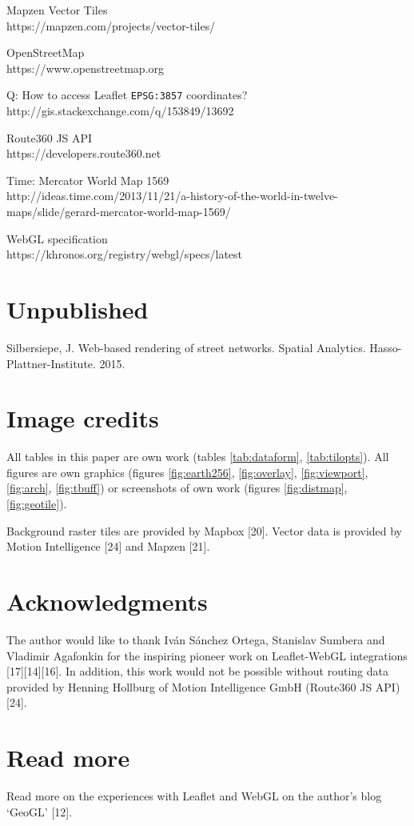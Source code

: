 \documentclass{motivation}
\begin{document}
\begin{enumerate}[{[1]}]
  \item Mapzen Vector Tiles\\
    https://mapzen.com/projects/vector-tiles/
  \item OpenStreetMap\\
    https://www.openstreetmap.org
  \item Q: How to access Leaflet \texttt{EPSG:3857} coordinates?\\
    http://gis.stackexchange.com/q/153849/13692
  \item Route360 JS API\\
    https://developers.route360.net
  \item Time: Mercator World Map 1569\\
    http://ideas.time.com/2013/11/21/a-history-of-the-world-in-twelve-maps/slide/gerard-mercator-world-map-1569/
  \item WebGL specification\\
    https://khronos.org/registry/webgl/specs/latest
  \end{enumerate}

\section{Unpublished}
  \begin{enumerate}[{[1]}]
  \setcounter{enumi}{26}
  \item Silbersiepe, J. Web-based rendering of street networks. Spatial Analytics. Hasso-Plattner-Institute. 2015.
  \end{enumerate}

\section{Image credits}
  All tables in this paper are own work (tables \ref{tab:dataform}, \ref{tab:tilopts}). All figures are own graphics (figures \ref{fig:earth256}, \ref{fig:overlay}, \ref{fig:viewport}, \ref{fig:arch}, \ref{fig:tbuff}) or screenshots of own work (figures \ref{fig:distmap}, \ref{fig:geotile}).\par

  Background raster tiles are provided by Mapbox [20]. Vector data is provided by Motion Intelligence [24] and Mapzen [21].

\section{Acknowledgments}
  The author would like to thank Iván Sánchez Ortega, Stanis\-lav Sumbera and Vladimir Agafonkin for the inspiring pioneer work on Leaflet-WebGL integrations [17][14][16]. In addition, this work would not be possible without routing data provided by Henning Hollburg of Motion Intelligence GmbH (Route360 JS API) [24].

\section{Read more}
  Read more on the experiences with Leaflet and WebGL on the author's blog `GeoGL' [12].

\balancecolumns
\end{document}
